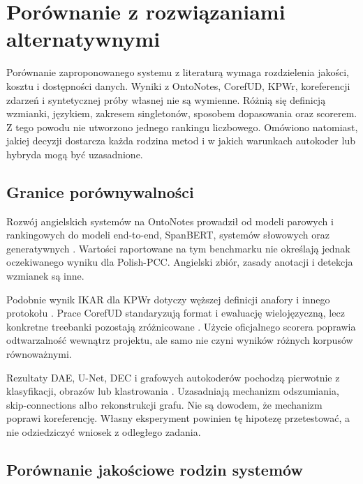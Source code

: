 \chapter{Porównanie z rozwiązaniami alternatywnymi}
\label{chap:porownanie}

Porównanie zaproponowanego systemu z literaturą wymaga rozdzielenia jakości, kosztu i dostępności danych. Wyniki z OntoNotes, CorefUD, KPWr, koreferencji zdarzeń i syntetycznej próby własnej nie są wymienne. Różnią się definicją wzmianki, językiem, zakresem singletonów, sposobem dopasowania oraz scorerem. Z tego powodu nie utworzono jednego rankingu liczbowego. Omówiono natomiast, jakiej decyzji dostarcza każda rodzina metod i w jakich warunkach autokoder lub hybryda mogą być uzasadnione.

\section{Granice porównywalności}

Rozwój angielskich systemów na OntoNotes prowadził od modeli parowych i rankingowych do modeli end-to-end, SpanBERT, systemów słowowych oraz generatywnych \cite{soon_2001_machine,lee_2017_e2e,joshi_2020_spanbert,dobrovolskii_2021_word,zhang_2023_seq2seq}. Wartości raportowane na tym benchmarku nie określają jednak oczekiwanego wyniku dla Polish-PCC. Angielski zbiór, zasady anotacji i detekcja wzmianek są inne.

Podobnie wynik IKAR dla KPWr dotyczy węższej definicji anafory i innego protokołu \cite{broda_2012_ikar}. Prace CorefUD standaryzują format i ewaluację wielojęzyczną, lecz konkretne treebanki pozostają zróżnicowane \cite{nedoluzhko_2022_corefud}. Użycie oficjalnego scorera poprawia odtwarzalność wewnątrz projektu, ale samo nie czyni wyników różnych korpusów równoważnymi.

Rezultaty DAE, U-Net, DEC i grafowych autokoderów pochodzą pierwotnie z klasyfikacji, obrazów lub klastrowania \cite{vincent_2008_dae,ronneberger_2015_unet,xie_2016_dec,kipf_2016_vgae}. Uzasadniają mechanizm odszumiania, skip-connections albo rekonstrukcji grafu. Nie są dowodem, że mechanizm poprawi koreferencję. Własny eksperyment powinien tę hipotezę przetestować, a nie odziedziczyć wniosek z odległego zadania.

\section{Porównanie jakościowe rodzin systemów}

